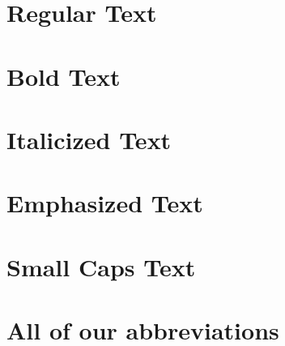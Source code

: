 \documentclass{article}
\begin{document}
\section{Regular Text}

\lipsum[1]

\section{Bold Text}

{\bfseries \lipsum[1]}

\section{Italicized Text}

{\textit{\lipsum[1]}}

\section{Emphasized Text}

{\emph{\lipsum[1]}}

\section{Small Caps Text}

{\textsc{\lipsum[1]}}



\section{All of our abbreviations}
\end{document}
